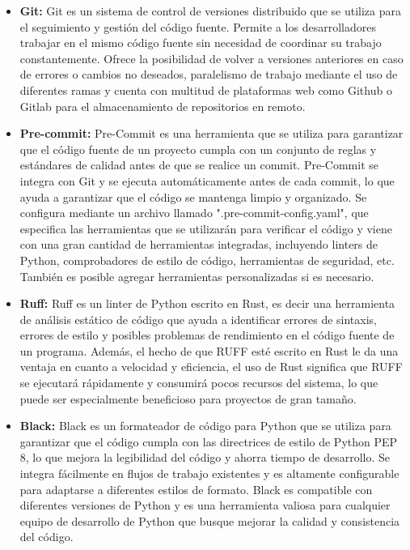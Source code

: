 \begin{itemize}
    \item \textbf{Git: } Git es un sistema de control de versiones distribuido que se utiliza para el 
    seguimiento y gestión del código fuente. Permite a los desarrolladores trabajar en el mismo código fuente 
    sin necesidad de coordinar su trabajo constantemente. Ofrece la posibilidad de volver a versiones anteriores en 
    caso de errores o cambios no deseados, paralelismo de trabajo mediante el uso de diferentes ramas y cuenta 
    con multitud de plataformas web como Github o Gitlab para el almacenamiento de repositorios en remoto.

    \item \textbf{Pre-commit: } Pre-Commit es una herramienta que se utiliza para garantizar que el código 
    fuente de un proyecto cumpla con un conjunto de reglas y estándares de calidad antes de que se realice 
    un commit. Pre-Commit se integra con Git y se ejecuta automáticamente antes de cada commit, lo que ayuda 
    a garantizar que el código se mantenga limpio y organizado. Se configura mediante un archivo llamado 
    ".pre-commit-config.yaml", que especifica las herramientas que se utilizarán para verificar el código 
    y viene con una gran cantidad de herramientas integradas, incluyendo linters de Python, comprobadores 
    de estilo de código, herramientas de seguridad, etc. También es posible agregar herramientas 
    personalizadas si es necesario.

    \item \textbf{Ruff:} Ruff es un linter de Python escrito en Rust, es decir una herramienta de 
    análisis estático de código que ayuda a identificar errores de sintaxis, errores de estilo y posibles 
    problemas de rendimiento en el código fuente de un programa. Además, el hecho de que RUFF esté escrito 
    en Rust le da una ventaja en cuanto a velocidad y eficiencia, el uso de Rust significa que RUFF se 
    ejecutará rápidamente y consumirá pocos recursos del sistema, lo que puede ser especialmente beneficioso 
    para proyectos de gran tamaño.

    \item \textbf{Black: } Black es un formateador de código para Python que se utiliza para garantizar
    que el código cumpla con las directrices de estilo de Python PEP 8, lo que mejora la legibilidad 
    del código y ahorra tiempo de desarrollo. Se integra fácilmente en flujos de trabajo existentes 
    y es altamente configurable para adaptarse a diferentes estilos de formato. Black es compatible 
    con diferentes versiones de Python y es una herramienta valiosa para cualquier equipo de desarrollo 
    de Python que busque mejorar la calidad y consistencia del código.


\end{itemize}
